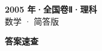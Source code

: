 \documentclass[zihao=-4, a4paper]{ctexart}
\begin{document}
\begin{center}
  {\Large\bfseries 2005 年·全国卷Ⅱ·理科}\\[4pt]
  {\large 数学 · 简答版}
\end{center}
\medskip
{}

\clearpage
{}
\begin{center}{\Large\bfseries 答案速查}\end{center}
\medskip

\end{document}
